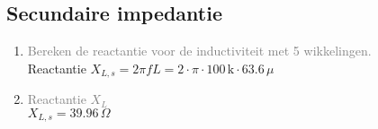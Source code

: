 \subsection{Secundaire impedantie}
\begin{enumerate}
    \item \textcolor{gray}{Bereken de reactantie voor de inductiviteit met 5 wikkelingen.}
    \\ Reactantie \( X_{L,s} = 2 \pi f L = 2 \cdot \pi \cdot 100 \, \text{k} \cdot 63.6 \, \mu \)
    
    \item \textcolor{gray}{Reactantie \(X_{L}\)}
    \\ \(X_{L,s} = 39.96 \, \Omega\)
\end{enumerate}

